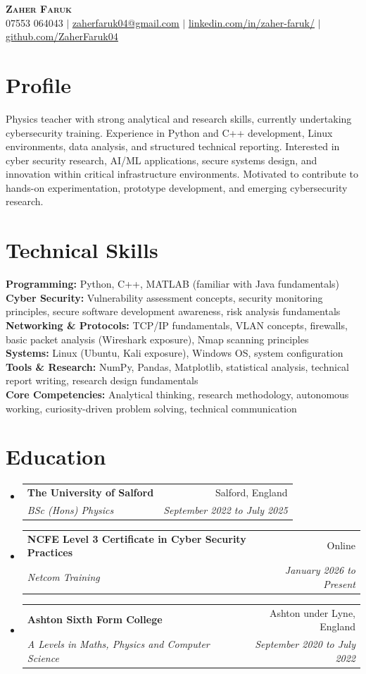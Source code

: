 \documentclass[letterpaper,11pt]{article}
\makeatletter
\newcommand{\resumeSubheading}[4]{
  \vspace{-2pt}\item
    \begin{tabular*}{0.97\textwidth}[t]{l@{\extracolsep{\fill}}r}
      \textbf{#1} & #2 \\
      \textit{\small#3} & \textit{\small #4} \\
    \end{tabular*}\vspace{-7pt}
}
\newcommand{\resumeSubHeadingListStart}{\begin{itemize}[leftmargin=0.15in, label={}]}
\newcommand{\resumeSubHeadingListEnd}{\end{itemize}}
\makeatother
\begin{document}

\begin{center}
    \textbf{\Huge \scshape Zaher Faruk} \\ \vspace{1pt}
    \small 07553 064043 $|$ \href{mailto:zaherfaruk04@gmail.com}{\underline{zaherfaruk04@gmail.com}} $|$
    \href{https://www.linkedin.com/in/zaher-faruk/}{\underline{linkedin.com/in/zaher-faruk/}} $|$
    \href{https://github.com/ZaherFaruk04}{\underline{github.com/ZaherFaruk04}}
\end{center}

\section{Profile}
\small{
Physics teacher with strong analytical and research skills, currently undertaking cybersecurity training. Experience in Python and C++ development, Linux environments, data analysis, and structured technical reporting. Interested in cyber security research, AI/ML applications, secure systems design, and innovation within critical infrastructure environments. Motivated to contribute to hands-on experimentation, prototype development, and emerging cybersecurity research.
}

\section{Technical Skills}
\small{
\textbf{Programming:} Python, C++, MATLAB (familiar with Java fundamentals) \\
\textbf{Cyber Security:} Vulnerability assessment concepts, security monitoring principles, secure software development awareness, risk analysis fundamentals \\
\textbf{Networking \& Protocols:} TCP/IP fundamentals, VLAN concepts, firewalls, basic packet analysis (Wireshark exposure), Nmap scanning principles \\
\textbf{Systems:} Linux (Ubuntu, Kali exposure), Windows OS, system configuration \\
\textbf{Tools \& Research:} NumPy, Pandas, Matplotlib, statistical analysis, technical report writing, research design fundamentals \\
\textbf{Core Competencies:} Analytical thinking, research methodology, autonomous working, curiosity-driven problem solving, technical communication
}

\section{Education}
\resumeSubHeadingListStart
  \resumeSubheading
    {The University of Salford}{Salford, England}
    {BSc (Hons) Physics}{September 2022 to July 2025}
  \resumeSubheading
    {NCFE Level 3 Certificate in Cyber Security Practices}{Online}
    {Netcom Training}{January 2026 to Present}
  \resumeSubheading
    {Ashton Sixth Form College}{Ashton under Lyne, England}
    {A Levels in Maths, Physics and Computer Science}{September 2020 to July 2022}
\resumeSubHeadingListEnd
\end{document}
